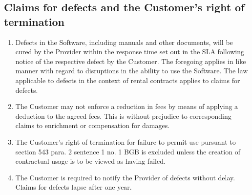 \documentclass{terms}
\begin{document}
\subsection{Claims for defects and the Customer's right of termination}
\begin{enumerate}
\item Defects in the Software, including manuals and other documents, will be cured by the Provider within the response time set out in the SLA following notice of the respective defect by the Customer. The foregoing applies in like manner with regard to disruptions in the ability to use the Software. The law applicable to defects in the context of rental contracts applies to claims for defects.
\item The Customer may not enforce a reduction in fees by means of applying a deduction to the agreed fees. This is without prejudice to corresponding claims to enrichment or compensation for damages.
\item The Customer's right of termination for failure to permit use pursuant to section 543 para. 2 sentence 1 no. 1 BGB is excluded unless the creation of contractual usage is to be viewed as having failed.
\item The Customer is required to notify the Provider of defects without delay. Claims for defects lapse after one year.
\end{enumerate}
\end{document}
